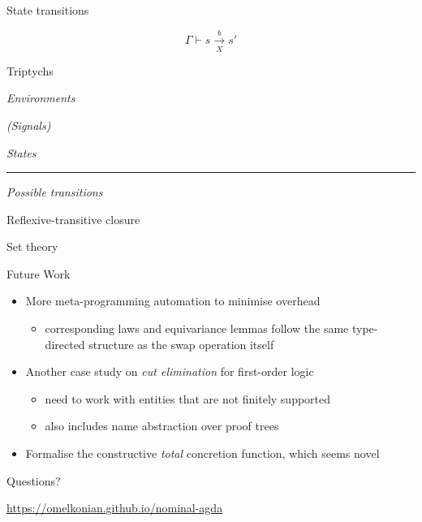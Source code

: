 \documentclass[aspectratio=169]{beamer}
\renewcommand\alert[1]{\textcolor{mLightBrown}{#1}}
\begin{document}
\begin{frame}{State transitions}
\begin{center}
\[ Γ ⊢ s \xrightarrow[X]{b} s' \]
\end{center}
\vfill
\transitionType{}
\end{frame}

\begin{frame}{Triptychs}
\begin{minipage}{.4\textwidth}
\emph{Environments}

\emph{(Signals)}
\end{minipage}
\hfill\vrule\hfill
\begin{minipage}{.4\textwidth}
\emph{States}
\end{minipage}
\hrule
\centering
\vspace{2pt}
\emph{Possible transitions}
\end{frame}

\begin{frame}{Reflexive-transitive closure}
\rtClosure{}
\end{frame}

\begin{frame}{Set theory}
\setTheory{}
\end{frame}


\begin{frame}{Future Work}
\begin{itemize}
\item More meta-programming automation to minimise overhead
  \begin{itemize}
  \item corresponding laws and equivariance lemmas follow the same type-directed structure
 as the swap operation itself
  \end{itemize}
\item Another case study on \emph{cut elimination} for first-order logic
  \begin{itemize}
  \item need to work with entities that are not finitely supported
  \item also includes name abstraction over proof trees
  \end{itemize}
\item Formalise the constructive \emph{total} concretion function, which seems novel
\end{itemize}
\end{frame}

\begin{frame}[standout]
Questions?
\vfill
\begin{center}
\alert{\url{https://omelkonian.github.io/nominal-agda}}
\end{center}
\end{frame}
\end{document}
